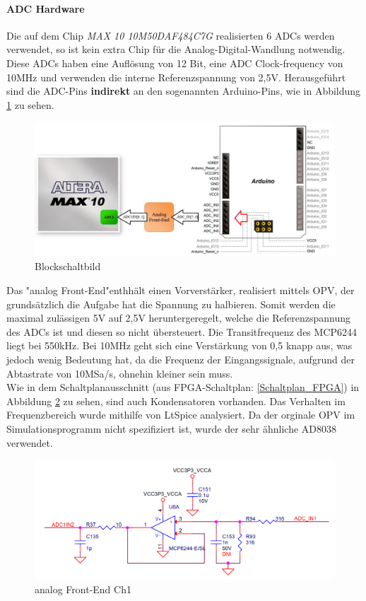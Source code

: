 \paragraph{ADC Hardware}
Die auf dem Chip \textit{MAX 10 10M50DAF484C7G} realisierten 6 ADCs werden verwendet, so ist kein extra Chip für die Analog-Digital-Wandlung notwendig. Diese ADCs haben eine Auflösung von 12 Bit, eine ADC Clock-frequency von 10MHz und verwenden die interne Referenzspannung von 2,5V. Herausgeführt sind die ADC-Pins \textbf{indirekt} an den sogenannten Arduino-Pins, wie in Abbildung \ref{ADC_Blockschaltbild} zu sehen.
\begin{figure}[!h]
\begin{center}
\includegraphics[width=15cm]{SAUER/Grafiken/ADC_Arduino_Pins.PNG}
\caption{Blockschaltbild}
\label{ADC_Blockschaltbild}
\end{center}
\end{figure}
Das "analog Front-End"enthhält einen Vorverstärker, realisiert mittels OPV, der grundsätzlich die Aufgabe hat die Spannung zu halbieren. Somit werden die maximal zulässigen 5V auf 2,5V heruntergeregelt, welche die Referenzspannung des ADCs ist und diesen so nicht übersteuert. Die Transitfrequenz des MCP6244 liegt bei 550kHz. Bei 10MHz geht sich eine Verstärkung von 0,5 knapp aus, was jedoch wenig Bedeutung hat, da die Frequenz der Eingangssignale, aufgrund der Abtastrate von 10MSa/s, ohnehin kleiner sein muss. \\Wie in dem Schaltplanausschnitt (aus FPGA-Schaltplan: \ref{Schaltplan_FPGA}) in Abbildung \ref{Front-End_Schaltung} zu sehen, sind auch Kondensatoren vorhanden. Das Verhalten im Frequenzbereich wurde mithilfe von LtSpice analysiert. Da der orginale OPV im Simulationsprogramm nicht spezifiziert ist, wurde der sehr ähnliche AD8038 verwendet.
\begin{figure}[!h]
\begin{center}
\includegraphics[width=15cm]{SAUER/Grafiken/ADC_Front-End.PNG}
\caption{analog Front-End Ch1}
\label{Front-End_Schaltung}
\end{center}
\end{figure}
